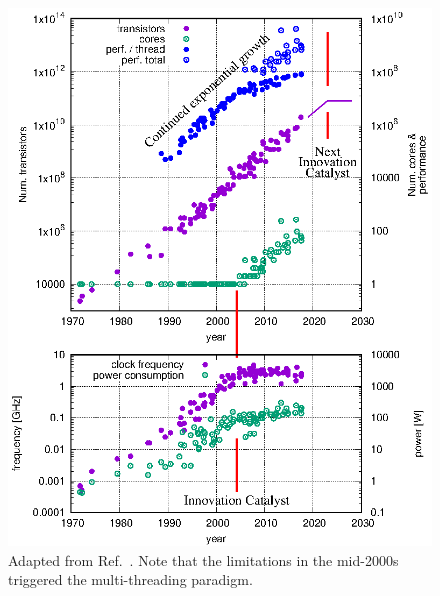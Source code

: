 \documentclass{article}
\begin{document}
\begin{figure}
	\vspace{-1.5\baselineskip}
	\centerline{ \includegraphics[clip,trim={-2cm -2cm 1.5cm 1.5cm},width=\linewidth]{./figs/plotting.technology.eps} }
	\vspace{-1\baselineskip}
	\caption{
		\label{fig::technology} 
		Adapted from Ref.~\cite{MicroprocessorTrendData}. Note that the limitations in the mid-2000s triggered the multi-threading paradigm.
	}
\end{figure}
\end{document}
